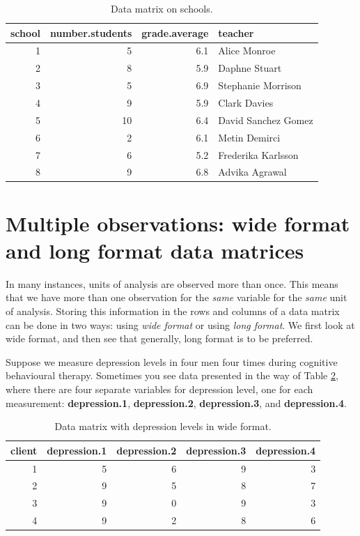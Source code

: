 \documentclass[]{book}\usepackage[]{graphicx}\usepackage[]{color}
\begin{document}
\begin{table}[ht]
\centering
\caption{Data matrix on schools.} 
\label{tab:data_3}
\begin{tabular}{rrrl}
  \hline
school & number.students & grade.average & teacher \\ 
  \hline
1 & 5 & 6.1 & Alice Monroe \\ 
  2 & 8 & 5.9 & Daphne Stuart \\ 
  3 & 5 & 6.9 & Stephanie Morrison \\ 
  4 & 9 & 5.9 & Clark Davies \\ 
  5 & 10 & 6.4 & David Sanchez Gomez \\ 
  6 & 2 & 6.1 & Metin Demirci \\ 
  7 & 6 & 5.2 & Frederika Karlsson \\ 
  8 & 9 & 6.8 & Advika Agrawal \\ 
   \hline
\end{tabular}
\end{table}



\section{Multiple observations: wide format and long format data matrices}

In many instances, units of analysis are observed more than once. This means that we have more than one observation for the \textit{same} variable for the \textit{same} unit of analysis. Storing this information in the rows and columns of a data matrix can be done in two ways: using \textit{wide format} or using \textit{long format}. We first look at wide format, and then see that generally, long format is to be preferred.

Suppose we measure depression levels in four men four times during cognitive behavioural therapy. Sometimes you see data presented in the way of Table \ref{tab:data_7}, where there are four separate variables for depression level, one for each measurement: \textbf{depression.1}, \textbf{depression.2}, \textbf{depression.3}, and \textbf{depression.4}.

\begin{table}[ht]
\centering
\caption{Data matrix with depression levels in wide format.} 
\label{tab:data_7}
\begin{tabular}{rrrrr}
  \hline
client & depression.1 & depression.2 & depression.3 & depression.4 \\ 
  \hline
1 & 5 & 6 & 9 & 3 \\ 
  2 & 9 & 5 & 8 & 7 \\ 
  3 & 9 & 0 & 9 & 3 \\ 
  4 & 9 & 2 & 8 & 6 \\ 
   \hline
\end{tabular}
\end{table}
\end{document}
